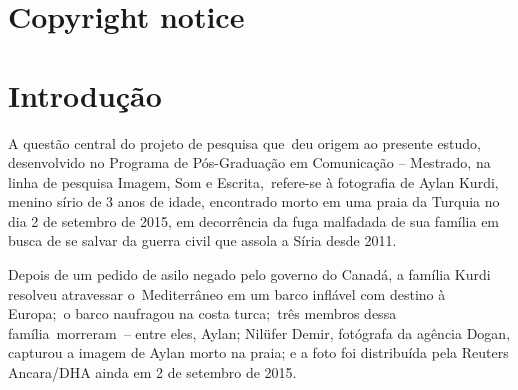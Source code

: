 \documentclass[
  letterpaper,
]{abntex2}
\renewcommand*\contentsname{Table of contents}
\newcommand\contentsname{Table of contents}
\begin{document}
\maketitle
\ifdefined\Shaded\renewenvironment{Shaded}{\begin{tcolorbox}[frame hidden, breakable, enhanced, interior hidden, borderline west={3pt}{0pt}{shadecolor}, boxrule=0pt, sharp corners]}{\end{tcolorbox}}\fi

\renewcommand*\contentsname{Sumário}
{
\hypersetup{linkcolor=}
\setcounter{tocdepth}{2}
\tableofcontents
}

\hypertarget{copyright-notice}{%
\chapter*{Copyright notice}\label{copyright-notice}}



\hypertarget{introduuxe7uxe3o}{%
\chapter{Introdução}\label{introduuxe7uxe3o}}

A questão central do projeto de pesquisa que~deu origem ao presente
estudo, desenvolvido no Programa de Pós-Graduação em Comunicação --
Mestrado, na linha de pesquisa Imagem, Som e Escrita,~refere-se à
fotografia de Aylan Kurdi, menino sírio de 3 anos de idade, encontrado
morto em uma praia da Turquia no dia 2 de setembro de 2015, em
decorrência da fuga malfadada de sua família em busca de se salvar da
guerra civil que assola a Síria desde 2011.~

Depois de um pedido de asilo negado pelo governo do Canadá, a família
Kurdi resolveu atravessar o~Mediterrâneo em um barco inflável com
destino à Europa;~o barco naufragou na costa turca;~três membros dessa
família~morreram~-- entre eles, Aylan; Nilüfer Demir, fotógrafa da
agência Dogan, capturou a imagem de Aylan morto na praia; e a foto foi
distribuída pela Reuters Ancara/DHA ainda em 2 de setembro de 2015.
\end{document}
